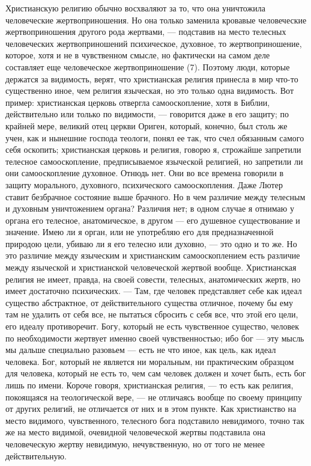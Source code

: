 \documentclass[12pt]{article}
\begin{document}
Христианскую религию обычно восхваляют за то, что она уничтожила человеческие жертвоприношения. Но она только заменила кровавые человеческие жертвоприношения другого рода жертвами, --- подставив на место телесных человеческих жертвоприношений психическое, духовное, то жертвоприношение, которое, хотя и не в чувственном смысле, но фактически на самом деле составляет еще человеческое жертвоприношение (7). Поэтому люди, которые держатся за видимость, верят, что христианская религия принесла в мир что-то существенно иное, чем религия языческая, но это только одна видимость. Вот пример: христианская церковь отвергла самооскопление, хотя в Библии, действительно или только по видимости, --- говорится даже в его защиту; по крайней мере, великий отец церкви Ориген, который, конечно, был столь же учен, как и нынешние господа теологи, понял ее так, что счел обязанным самого себя оскопить; христианская церковь и религия, говорю я, строжайше запретили телесное самооскопление, предписываемое языческой религией, но запретили ли они самооскопление духовное. Отнюдь нет. Они во все времена говорили в защиту морального, духовного, психического самооскопления. Даже Лютер ставит безбрачное состояние выше брачного. Но в чем различие между телесным и духовным уничтожением органа? Различия нет; в одном случае я отнимаю у органа его телесное, анатомическое, в другом --- его душевное существование и значение. Имею ли я орган, или не употребляю его для предназначенной природою цели, убиваю ли я его телесно или духовно, --- это одно и то же. Но это различие между языческим и христианским самооскоплением есть различие между языческой и христианской человеческой жертвой вообще. Христианская религия не имеет, правда, на своей совести, телесных, анатомических жертв, но имеет достаточно психических. --- Там, где человек представляет себе как идеал существо абстрактное, от действительного существа отличное, почему бы ему там не удалить от себя все, не пытаться сбросить с себя все, что этой его цели, его идеалу противоречит. Богу, который не есть чувственное существо, человек по необходимости жертвует именно своей чувственностью; ибо бог --- эту мысль мы дальше специально разовьем --- есть не что иное, как цель, как идеал человека. Бог, который не является ни моральным, ни практическим образцом для человека, который не есть то, чем сам человек должен и хочет быть, есть бог лишь по имени. Короче говоря, христианская религия, --- то есть как религия, покоящаяся на теологической вере, --- не отличаясь вообще по своему принципу от других религий, не отличается от них и в этом пункте. Как христианство на место видимого, чувственного, телесного бога подставило невидимого, точно так же на место видимой, очевидной человеческой жертвы подставила она человеческую жертву невидимую, нечувственную, но от того не менее действительную. 
\end{document}
